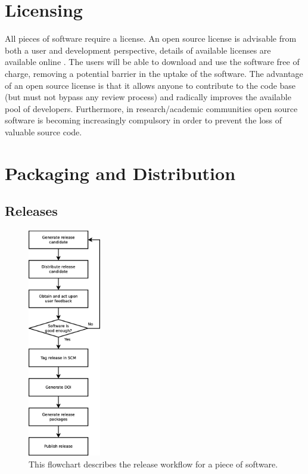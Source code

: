 \documentclass[jnr]{iosart2x}
\begin{document}
\begin{itemzie}
\section{Licensing}
\label{Licensing}

All pieces of software require a license.
An open source license is advisable from both a user and development perspective, details of available licenses are available online \cite{OSI_Licenses}.
The users will be able to download and use the software free of charge, removing a potential barrier in the uptake of the software.
The advantage of an open source license is that it allows anyone to contribute to the code base (but must not bypass any review process) and radically improves the available pool of developers.
Furthermore, in research/academic communities open source software is becoming increasingly compulsory in order to prevent the loss of valuable source code.

\section{Packaging and Distribution}
\label{Packaging and Distribution}

\subsection{Releases}
\label{Releases}

\begin{figure}
    \centering
    \includegraphics[height=10cm]{release_workflow.eps}
    \caption{This flowchart describes the release workflow for a piece of software.}
    \label{Release_Flowchart}
\end{figure}


\end{itemzie}
\end{document}
